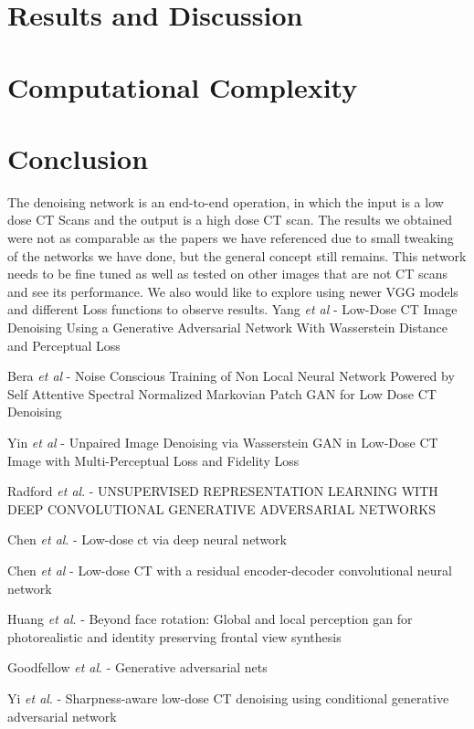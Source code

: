 \documentclass[journal]{IEEEtran}
\begin{document}
\section{Results and Discussion}
\label{results and discussion}

\section{Computational Complexity}
\label{complexity}

\section{Conclusion}
\label{conclusion}
The denoising network is an end-to-end operation, in which the input is a low dose CT Scans and the output is a high dose CT scan.  The results we obtained were not as comparable as the papers we have referenced due to small tweaking of the networks we have done, but the general concept still remains.  This network needs to be fine tuned as well as tested on other images that are not CT scans and see its performance.  We also would like to explore using newer VGG models and different Loss functions to observe results.  
\cleardoublepage
\cite{8340157} Yang \emph{et al} - Low-Dose CT Image Denoising Using a Generative Adversarial Network With Wasserstein Distance and Perceptual Loss

\cite{9474492} Bera \emph{et al} - Noise Conscious Training of Non Local Neural Network Powered by Self Attentive Spectral Normalized Markovian Patch GAN for Low Dose CT Denoising

\cite{yin2021unpaired} Yin \emph{et al} - Unpaired Image Denoising via Wasserstein GAN in Low-Dose CT Image with Multi-Perceptual Loss and Fidelity Loss

\cite{radford2015unsupervised} Radford \emph{et al}. - UNSUPERVISED REPRESENTATION LEARNING WITH DEEP CONVOLUTIONAL GENERATIVE ADVERSARIAL NETWORKS

\cite{chen2017low} Chen \emph{et al}. - Low-dose ct via deep neural network

\cite{chen2017low2} Chen \emph{et al} - Low-dose CT with a residual encoder-decoder convolutional neural network

\cite{huang2017beyond} Huang \emph{et al}. - Beyond face rotation: Global and local perception gan for photorealistic and identity preserving frontal view synthesis

\cite{goodfellow2014generative} Goodfellow \emph{et al}. - Generative adversarial nets

\cite{yi2018sharpness} Yi \emph{et al}. - Sharpness-aware low-dose CT denoising using conditional generative adversarial network





\end{document}
